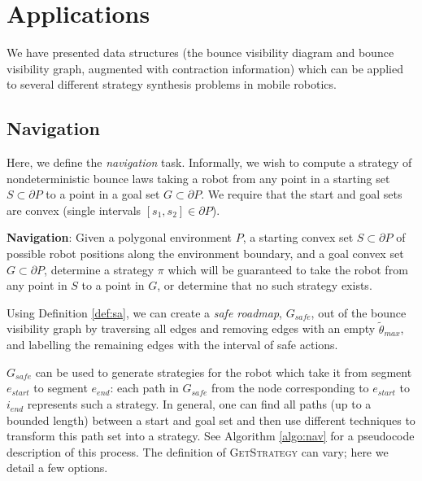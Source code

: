 \documentclass[]{styles/svproc}  %
\begin{document}
\section{Applications}

We have presented data structures (the bounce visibility diagram and bounce
visibility graph, augmented with contraction information) which can be applied
to several different strategy synthesis problems in mobile robotics.

\subsection{Navigation}

Here, we define the \emph{navigation} task. Informally, we wish to compute a strategy 
of nondeterministic bounce laws taking a robot
from any point in a starting set $S \subset \partial P$ to a point in a goal set
$G \subset \partial P$. We require that the start and goal sets are
convex (single intervals $[s_1, s_2] \in \partial P$).

\begin{definition}
\textbf{Navigation}:
Given a polygonal environment $P$, a starting convex set $S \subset \partial P$ of possible robot positions along the
environment boundary, and a goal convex set $G \subset \partial P$, determine a strategy $\pi$ which
will be guaranteed to take the robot from any point in $S$ to a point in $G$, or
determine that no such strategy exists.
\end{definition}

Using Definition \ref{def:sa}, we can create a \emph{safe roadmap}, $G_{safe}$,
out of the 
bounce visibility graph by traversing all edges and removing edges with an 
empty $\tilde{\theta}_{max}$, and labelling the remaining edges with the interval 
of safe actions.

$G_{safe}$ can be used to generate strategies for the
robot which take it from segment $e_{start}$ to segment $e_{end}$: each path in
$G_{safe}$ from the node corresponding to $e_{start}$ to $i_{end}$ represents
such a strategy. In general, one can find all paths (up to a bounded length)
between a start and goal set and then use different techniques to transform this
path set into a strategy. See Algorithm \ref{algo:nav} for a pseudocode
description of this process. The definition of \textsc{GetStrategy} can vary;
here we detail a few options.
\end{document}
